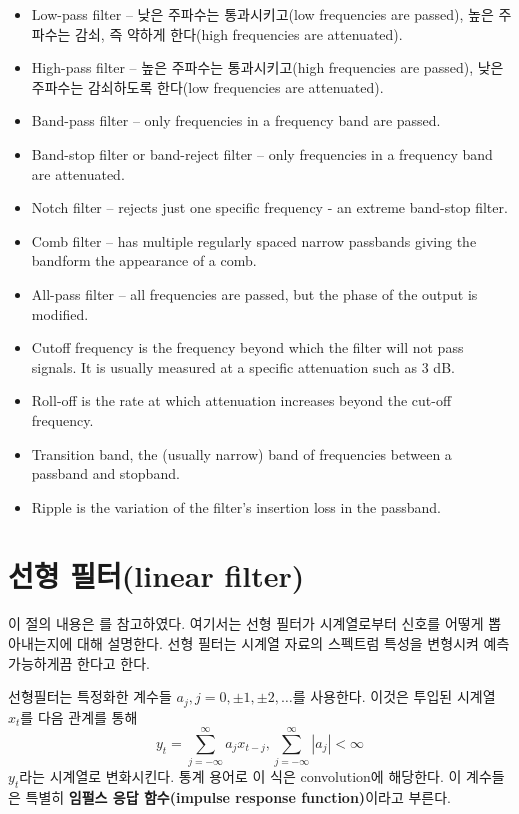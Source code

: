 \documentclass[b5paper,]{scrbook}
\theoremstyle{plain}
\theoremstyle{definition}
\numberwithin{equation}{section}
\begin{document}
\begin{itemize}
\item
  Low-pass filter -- 낮은 주파수는 통과시키고(low frequencies are
  passed), 높은 주파수는 감쇠, 즉 약하게 한다(high frequencies are
  attenuated).
\item
  High-pass filter -- 높은 주파수는 통과시키고(high frequencies are
  passed), 낮은 주파수는 감쇠하도록 한다(low frequencies are
  attenuated).
\item
  Band-pass filter -- only frequencies in a frequency band are passed.
\item
  Band-stop filter or band-reject filter -- only frequencies in a
  frequency band are attenuated.
\item
  Notch filter -- rejects just one specific frequency - an extreme
  band-stop filter.
\item
  Comb filter -- has multiple regularly spaced narrow passbands giving
  the bandform the appearance of a comb.
\item
  All-pass filter -- all frequencies are passed, but the phase of the
  output is modified.
\item
  Cutoff frequency is the frequency beyond which the filter will not
  pass signals. It is usually measured at a specific attenuation such as
  3 dB.
\item
  Roll-off is the rate at which attenuation increases beyond the cut-off
  frequency.
\item
  Transition band, the (usually narrow) band of frequencies between a
  passband and stopband.
\item
  Ripple is the variation of the filter's insertion loss in the
  passband.
\end{itemize}

\section{선형 필터(linear filter)}\label{-linear-filter}

이 절의 내용은 \citep{Shumway2010}를 참고하였다. 여기서는 선형 필터가
시계열로부터 신호를 어떻게 뽑아내는지에 대해 설명한다. 선형 필터는
시계열 자료의 스펙트럼 특성을 변형시켜 예측 가능하게끔 한다고 한다.

선형필터는 특정화한 계수들 \(a_{j}, j=0,\pm 1, \pm 2, \ldots\)를
사용한다. 이것은 투입된 시계열 \(x_{t}\)를 다음 관계를 통해
\[y_{t}=\sum_{j=-\infty}^{\infty}a_{j}x_{t-j}, \sum_{j=-\infty}^{\infty}|a_{j}| <\infty\]
\(y_{t}\)라는 시계열로 변화시킨다. 통계 용어로 이 식은 convolution에
해당한다. 이 계수들은 특별히 \textbf{임펄스 응답 함수(impulse response
function)}이라고 부른다.
\end{document}
